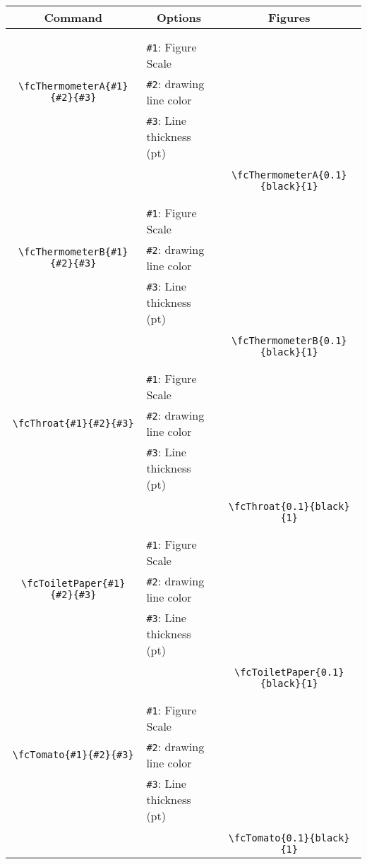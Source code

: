 \documentclass[x11names]{article}
\begin{document}
\begin{table}[H]\centering\begin{tabular}{|c|l|c|}\hline {\bf Command}& \multicolumn{1}{c|}{{\bf Options}} & {\bf Figures}\\  \hline	&&\multirow{5}{*}{\fcThermometerA{0.1}{black}{1}}\\	&&\\	&\verb|#1|: Figure Scale &\\	\verb|\fcThermometerA{#1}{#2}{#3}|&	\verb|#2|: drawing line color &\\	&\verb|#3|: Line thickness (pt) &\\ &&\\&&	\verb|\fcThermometerA{0.1}{black}{1}|\\\hline 	
	&&\multirow{5}{*}{\fcThermometerB{0.1}{black}{1}}\\	&&\\	&\verb|#1|: Figure Scale &\\	\verb|\fcThermometerB{#1}{#2}{#3}|&	\verb|#2|: drawing line color &\\	&\verb|#3|: Line thickness (pt) &\\ &&\\&&	\verb|\fcThermometerB{0.1}{black}{1}|\\\hline 	
	&&\multirow{5}{*}{\fcThroat{0.1}{black}{1}}\\	&&\\	&\verb|#1|: Figure Scale &\\	\verb|\fcThroat{#1}{#2}{#3}|&	\verb|#2|: drawing line color &\\	&\verb|#3|: Line thickness (pt) &\\ &&\\&&	\verb|\fcThroat{0.1}{black}{1}|\\\hline 	
	&&\multirow{5}{*}{\fcToiletPaper{0.1}{black}{1}}\\	&&\\	&\verb|#1|: Figure Scale &\\	\verb|\fcToiletPaper{#1}{#2}{#3}|&	\verb|#2|: drawing line color &\\	&\verb|#3|: Line thickness (pt) &\\ &&\\&&	\verb|\fcToiletPaper{0.1}{black}{1}|\\\hline 	
	&&\multirow{5}{*}{\fcTomato{0.1}{black}{1}}\\	&&\\	&\verb|#1|: Figure Scale &\\	\verb|\fcTomato{#1}{#2}{#3}|&	\verb|#2|: drawing line color &\\	&\verb|#3|: Line thickness (pt) &\\ &&\\&&	\verb|\fcTomato{0.1}{black}{1}|\\\hline 	

\end{tabular}
\end{table}
\end{document}
